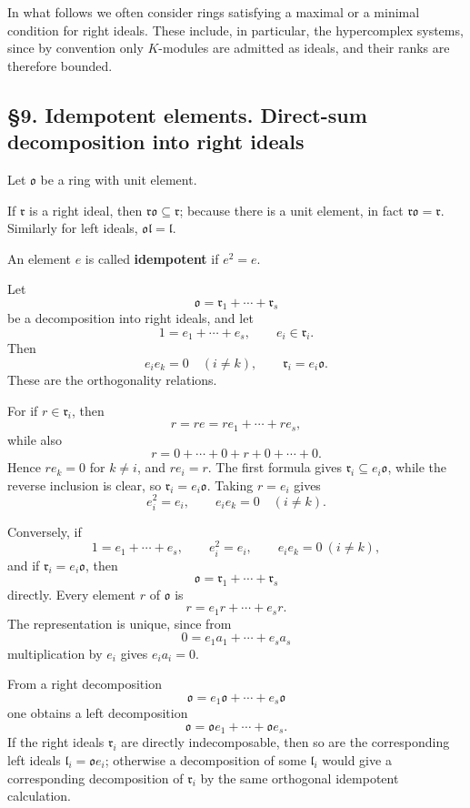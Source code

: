 \documentclass[11pt]{article}
\begin{document}
In what follows we often consider rings satisfying a maximal or a
minimal condition for right ideals. These include, in particular, the
hypercomplex systems, since by convention only \(K\)-modules are
admitted as ideals, and their ranks are therefore bounded.

\subsection{§9. Idempotent elements. Direct-sum decomposition into right
ideals}\label{idempotent-elements.-direct-sum-decomposition-into-right-ideals}

Let \(\mathfrak{o}\) be a ring with unit element.

If \(\mathfrak r\) is a right ideal, then
\(\mathfrak r\mathfrak{o}\subseteq\mathfrak r\); because there is a unit
element, in fact \(\mathfrak r\mathfrak{o}=\mathfrak r\). Similarly for
left ideals, \(\mathfrak{o}\mathfrak l=\mathfrak l\).

An element \(e\) is called \textbf{idempotent} if \(e^2=e\).

Let \[
  \mathfrak{o}=\mathfrak r_1+\cdots+\mathfrak r_s
\] be a decomposition into right ideals, and let \[
  1=e_1+\cdots+e_s,
  \qquad e_i\in\mathfrak r_i.
\] Then \[
  e_i e_k=0\quad(i\ne k),
  \qquad
  \mathfrak r_i=e_i\mathfrak{o}.
\] These are the orthogonality relations.

For if \(r\in\mathfrak r_i\), then \[
  r=re=r e_1+\cdots+r e_s,
\] while also \[
  r=0+\cdots+0+r+0+\cdots+0.
\] Hence \(re_k=0\) for \(k\ne i\), and \(re_i=r\). The first formula
gives \(\mathfrak r_i\subseteq e_i\mathfrak{o}\), while the reverse
inclusion is clear, so \(\mathfrak r_i=e_i\mathfrak{o}\). Taking
\(r=e_i\) gives \[
  e_i^2=e_i,
  \qquad e_i e_k=0\quad(i\ne k).
\]

Conversely, if \[
  1=e_1+\cdots+e_s,
  \qquad e_i^2=e_i,
  \qquad e_i e_k=0\ (i\ne k),
\] and if \(\mathfrak r_i=e_i\mathfrak{o}\), then \[
  \mathfrak{o}=\mathfrak r_1+\cdots+\mathfrak r_s
\] directly. Every element \(r\) of \(\mathfrak{o}\) is \[
  r=e_1r+\cdots+e_sr.
\] The representation is unique, since from \[
  0=e_1a_1+\cdots+e_sa_s
\] multiplication by \(e_i\) gives \(e_i a_i=0\).

From a right decomposition \[
  \mathfrak{o}=e_1\mathfrak{o}+\cdots+e_s\mathfrak{o}
\] one obtains a left decomposition \[
  \mathfrak{o}=\mathfrak{o}e_1+\cdots+\mathfrak{o}e_s.
\] If the right ideals \(\mathfrak r_i\) are directly indecomposable,
then so are the corresponding left ideals
\(\mathfrak l_i=\mathfrak{o}e_i\); otherwise a decomposition of some
\(\mathfrak l_i\) would give a corresponding decomposition of
\(\mathfrak r_i\) by the same orthogonal idempotent calculation.
\end{document}
